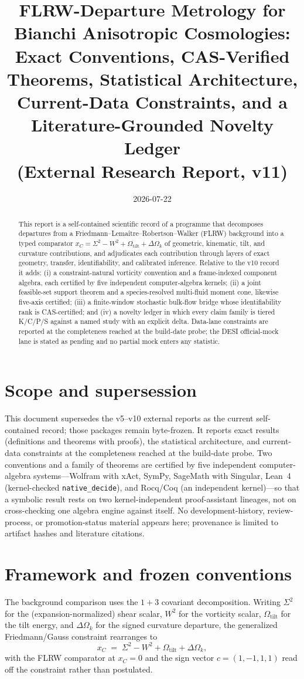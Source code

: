 \documentclass[11pt]{article}
\title{FLRW-Departure Metrology for Bianchi Anisotropic Cosmologies:\\
Exact Conventions, CAS-Verified Theorems, Statistical Architecture,\\
Current-Data Constraints, and a Literature-Grounded Novelty Ledger\\
\large (External Research Report, v11)}
\author{}
\date{2026-07-22}
\newcommand{\code}[1]{\texttt{#1}}
\begin{document}
\maketitle
\begin{abstract}
This report is a self-contained scientific record of a programme that decomposes
departures from a Friedmann--Lema\^itre--Robertson--Walker (FLRW) background into a
typed comparator $x_C = \Sigma^2 - W^2 + \Omega_{\text{tilt}} + \Delta\Omega_k$
of geometric, kinematic, tilt, and curvature contributions, and adjudicates each
contribution through layers of exact geometry, transfer, identifiability, and
calibrated inference. Relative to the v10 record it adds: (i) a
constraint-natural vorticity convention and a frame-indexed component algebra,
each certified by five independent computer-algebra kernels; (ii) a joint
feasible-set support theorem and a species-resolved multi-fluid moment cone,
likewise five-axis certified; (iii) a finite-window stochastic bulk-flow bridge
whose identifiability rank is CAS-certified; and (iv) a novelty ledger in which
every claim family is tiered K/C/P/S against a named study with an explicit
delta. Data-lane constraints are reported at the completeness reached at the
build-date probe; the DESI official-mock lane is stated as pending and no
partial mock enters any statistic.
\end{abstract}

\section{Scope and supersession}
This document supersedes the v5--v10 external reports as the current
self-contained record; those packages remain byte-frozen. It reports exact
results (definitions and theorems with proofs), the statistical architecture,
and current-data constraints at the completeness reached at the build-date
probe. Two conventions and a family of theorems are certified by five
independent computer-algebra systems---Wolfram with xAct, SymPy, SageMath with
Singular, Lean~4 (kernel-checked \code{native\_decide}), and Rocq/Coq (an
independent kernel)---so that a symbolic result rests on two kernel-independent
proof-assistant lineages, not on cross-checking one algebra engine against
itself. No development-history, review-process, or promotion-status material
appears here; provenance is limited to artifact hashes and literature citations.

\section{Framework and frozen conventions}
\label{sec:conv}
The background comparison uses the $1+3$ covariant decomposition. Writing
$\Sigma^2$ for the (expansion-normalized) shear scalar, $W^2$ for the vorticity
scalar, $\Omega_{\text{tilt}}$ for the tilt energy, and $\Delta\Omega_k$ for the
signed curvature departure, the generalized Friedmann/Gauss constraint
rearranges to
\[
x_C \;=\; \Sigma^2 - W^2 + \Omega_{\text{tilt}} + \Delta\Omega_k ,
\]
with the FLRW comparator at $x_C=0$ and the sign vector $c=(1,-1,1,1)$ read off
the constraint rather than postulated.
\end{document}
